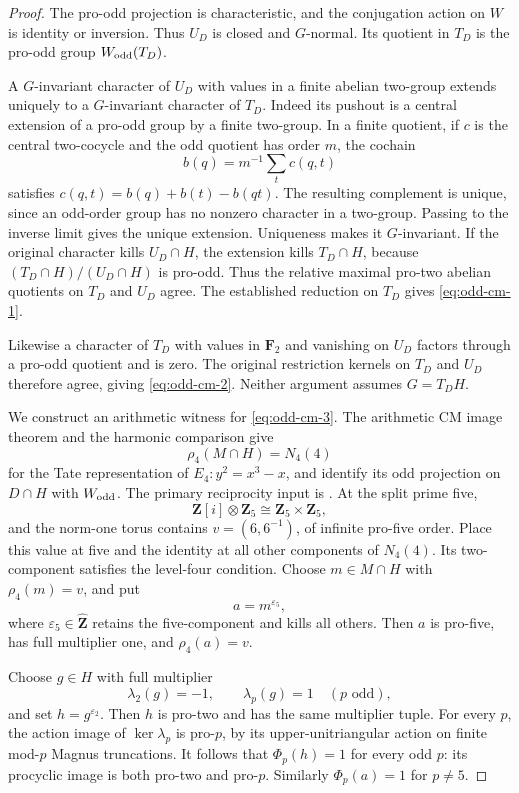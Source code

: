 \begin{proof}
The pro-odd projection is characteristic, and the conjugation
action on \(W\) is identity or inversion. Thus \(U_D\) is
closed and \(G\)-normal. Its quotient in \(T_D\) is the
pro-odd group \(W_{\rm odd}(T_D)\).

A \(G\)-invariant character of \(U_D\) with values in a finite
abelian two-group extends uniquely to a \(G\)-invariant
character of \(T_D\).
Indeed its pushout is a central extension of a pro-odd group
by a finite two-group. In a finite quotient, if \(c\) is the
central two-cocycle and the odd quotient has order \(m\), the
cochain
\[
 b(q)=m^{-1}\sum_t c(q,t)
\]
satisfies \(c(q,t)=b(q)+b(t)-b(qt)\).
The resulting complement is unique, since an odd-order group
has no nonzero character in a two-group. Passing to the
inverse limit gives the unique extension.
Uniqueness makes it \(G\)-invariant.
If the original character kills \(U_D\cap H\), the extension
kills \(T_D\cap H\), because
\((T_D\cap H)/(U_D\cap H)\) is pro-odd.
Thus the relative maximal pro-two abelian quotients on
\(T_D\) and \(U_D\) agree.
The established reduction on \(T_D\) gives \eqref{eq:odd-cm-1}.

Likewise a character of \(T_D\) with values in \(\mathbf F_2\)
and vanishing on \(U_D\) factors through a pro-odd quotient
and is zero. The original restriction kernels on \(T_D\)
and \(U_D\) therefore agree, giving \eqref{eq:odd-cm-2}.
Neither argument assumes \(G=T_DH\).

We construct an arithmetic witness for \eqref{eq:odd-cm-3}.
The arithmetic CM image theorem and the harmonic comparison
give
\[
 \rho_4(M\cap H)=N_4(4)
\]
for the Tate representation of \(E_4:y^2=x^3-x\), and identify
its odd projection on \(D\cap H\) with \(W_{\rm odd}\).
The primary reciprocity input is
\cite[Theorem~12.27, p.~124]{MilneMF110}.
At the split prime five,
\[
 \mathbf Z[i]\otimes\mathbf Z_5
       \cong\mathbf Z_5\times\mathbf Z_5,
\]
and the norm-one torus contains \(v=(6,6^{-1})\), of
infinite pro-five order.
Place this value at five and the identity at all other
components of \(N_4(4)\). Its two-component satisfies the
level-four condition.
Choose \(m\in M\cap H\) with \(\rho_4(m)=v\), and put
\[
 a=m^{\varepsilon_5},
\]
where \(\varepsilon_5\in\widehat{\mathbf Z}\) retains the
five-component and kills all others.
Then \(a\) is pro-five, has full multiplier one, and
\(\rho_4(a)=v\).

Choose \(g\in H\) with full multiplier
\[
 \lambda_2(g)=-1,\qquad
 \lambda_p(g)=1\quad(p\text{ odd}),
\]
and set \(h=g^{\varepsilon_2}\).
Then \(h\) is pro-two and has the same multiplier tuple.
For every \(p\), the action image of \(\ker\lambda_p\) is
pro-\(p\), by its upper-unitriangular action on finite
mod-\(p\) Magnus truncations.
It follows that \(\Phi_p(h)=1\) for every odd \(p\):
its procyclic image is both pro-two and pro-\(p\).
Similarly \(\Phi_p(a)=1\) for \(p\ne5\).


\end{proof}

